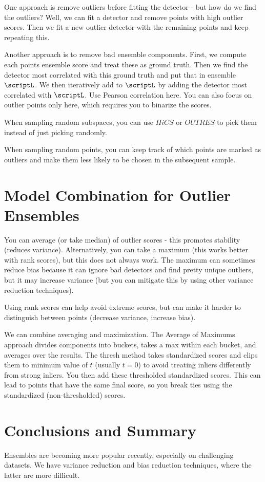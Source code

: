 \documentclass[a4paper]{article}
\begin{document}
One approach is remove outliers before fitting
the detector - but how do we find the outliers? Well, we can fit a detector
and remove points with high outlier scores. Then we fit a new outlier
detector with the remaining points and keep repeating this.

Another approach is to remove bad ensemble components. First, we compute
each points ensemble score and treat these as ground truth. Then we
find the detector most correlated with this ground truth and put that
in ensemble $\scriptL$. We then iteratively add to $\scriptL$ by adding
the detector most correlated with $\scriptL$. Use Pearson correlation here.
You can also focus on outlier points only here, which requires you to
binarize the scores.

When sampling random subspaces, you can use $HiCS$ or $OUTRES$ to pick
them instead of just picking randomly.

When sampling random points, you can keep track of which points are marked
as outliers and make them less likely to be chosen in the subsequent sample.

\section{Model Combination for Outlier Ensembles}
You can average (or take median) of outlier scores - this promotes stability
(reduces variance). Alternatively, you can take a maximum (this works
better with rank scores), but this does not always work. The maximum
can sometimes reduce bias because it can ignore bad detectors and find
pretty unique outliers, but it may increase variance (but you can
mitigate this by using other variance reduction techniques).

Using rank scores can help avoid extreme scores, but can make it harder
to distinguish between points (decrease variance, increase bias).

We can combine averaging and maximization. The Average of Maximums approach
divides components into buckets, takes a max within each bucket, and
averages over the results. The thresh method takes standardized scores
and clips them to minimum value of $t$ (usually $t = 0$) to avoid treating
inliers differently from strong inliers. You then add these thresholded
standardized scores. This can lead to points that have the same final score,
so you break ties using the standardized (non-thresholded) scores.

\section{Conclusions and Summary}
Ensembles are becoming more popular recently, especially on challenging
datasets. We have variance reduction and bias reduction techniques, where
the latter are more difficult.
\end{document}
